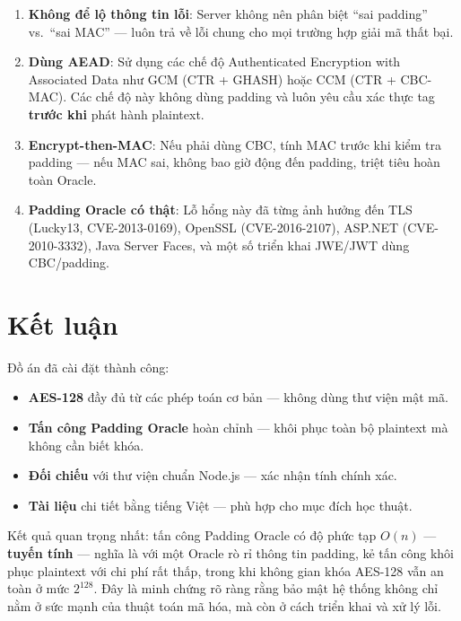 \begin{enumerate}
    \item \textbf{Không để lộ thông tin lỗi}: Server không nên phân biệt ``sai padding'' vs.\ ``sai MAC'' --- luôn trả về lỗi chung cho mọi trường hợp giải mã thất bại.
    
    \item \textbf{Dùng AEAD}: Sử dụng các chế độ Authenticated Encryption with Associated Data như GCM (CTR + GHASH) hoặc CCM (CTR + CBC-MAC). Các chế độ này không dùng padding và luôn yêu cầu xác thực tag \textbf{trước khi} phát hành plaintext.
    
    \item \textbf{Encrypt-then-MAC}: Nếu phải dùng CBC, tính MAC trước khi kiểm tra padding --- nếu MAC sai, không bao giờ động đến padding, triệt tiêu hoàn toàn Oracle.
    
    \item \textbf{Padding Oracle có thật}: Lỗ hổng này đã từng ảnh hưởng đến TLS (Lucky13, CVE-2013-0169), OpenSSL (CVE-2016-2107), ASP.NET (CVE-2010-3332), Java Server Faces, và một số triển khai JWE/JWT dùng CBC/padding.
\end{enumerate}

\section{Kết luận}
\label{sec:conclusion}

Đồ án đã cài đặt thành công:
\begin{itemize}
    \item \textbf{AES-128} đầy đủ từ các phép toán cơ bản --- không dùng thư viện mật mã.
    \item \textbf{Tấn công Padding Oracle} hoàn chỉnh --- khôi phục toàn bộ plaintext mà không cần biết khóa.
    \item \textbf{Đối chiếu} với thư viện chuẩn Node.js --- xác nhận tính chính xác.
    \item \textbf{Tài liệu} chi tiết bằng tiếng Việt --- phù hợp cho mục đích học thuật.
\end{itemize}

Kết quả quan trọng nhất: tấn công Padding Oracle có độ phức tạp $O(n)$ --- \textbf{tuyến tính} --- nghĩa là với một Oracle rò rỉ thông tin padding, kẻ tấn công khôi phục plaintext với chi phí rất thấp, trong khi không gian khóa AES-128 vẫn an toàn ở mức $2^{128}$. Đây là minh chứng rõ ràng rằng bảo mật hệ thống không chỉ nằm ở sức mạnh của thuật toán mã hóa, mà còn ở cách triển khai và xử lý lỗi.
